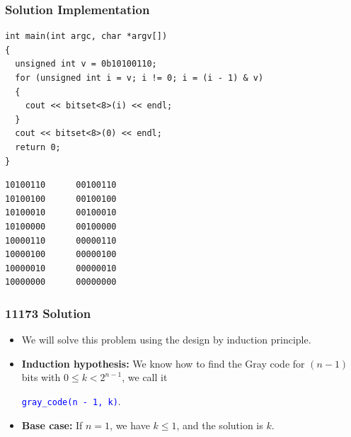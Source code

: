 \documentclass{beamer}
\newcommand{\uvalink}[2]{UVa Online Judge (http://uva.onlinejudge.org)
  problem number \href{#2}{\textcolor{blue}{#1}.}}
\newcounter{exo}
\newcommand{\exo}{
  \addtocounter{exo}{1}
  Exercice \arabic{exo}
}
\begin{document}
\begin{frame}[containsverbatim]
\frametitle{Solution Implementation}
\label{slide:bitmask_countdown}

\scriptsize

\begin{lstlisting}[mathescape]
int main(int argc, char *argv[])
{
  unsigned int v = 0b10100110;
  for (unsigned int i = v; i != 0; i = (i - 1) & v)
  {
    cout << bitset<8>(i) << endl;
  }
  cout << bitset<8>(0) << endl;
  return 0;
}
\end{lstlisting}

\begin{verbatim}
10100110      00100110
10100100      00100100
10100010      00100010
10100000      00100000
10000110      00000110
10000100      00000100
10000010      00000010
10000000      00000000
\end{verbatim}

\end{frame}

\fi


\ifanswers

\begin{frame}
\frametitle{11173 Solution}

\begin{itemize}

\item We will solve this problem using the design by induction principle.

\vspace{0.4cm}

\item<2-> \textbf{Induction hypothesis:} We know how to find the Gray code for $(n-1)$ bits with $0 \le k < 2^{n - 1}$,
we call it\\
\begin{center}
\textcolor{blue}{\texttt{gray\_code(n - 1, k)}}.
\end{center}

\vspace{0.4cm}

\item<3-> \textbf{Base case:} If $n = 1$, we have $k \le 1$, and the solution is $k$.

\end{itemize}

\end{frame}
\end{document}
